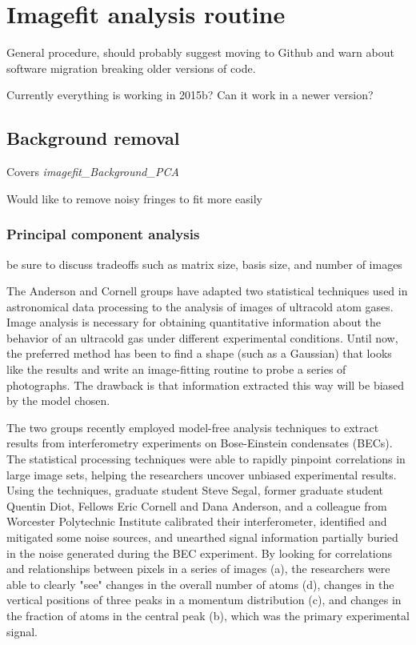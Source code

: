 \chapter{Imagefit analysis routine} \label{app:imagefitManual}
General procedure, should probably suggest moving to Github and warn about software migration breaking older versions of code.

Currently everything is working in 2015b? Can it work in a newer version?

\section{Background removal}

Covers \emph{imagefit\_Background\_PCA}

Would like to remove noisy fringes to fit more easily

\subsection{Principal component analysis}

be sure to discuss tradeoffs such as matrix size, basis size, and number of images

The Anderson and Cornell groups have adapted two statistical techniques used in astronomical data processing to the analysis of images of ultracold atom gases. Image analysis is necessary for obtaining quantitative information about the behavior of an ultracold gas under different experimental conditions. Until now, the preferred method has been to find a shape (such as a Gaussian) that looks like the results and write an image-fitting routine to probe a series of photographs. The drawback is that information extracted this way will be biased by the model chosen.

The two groups recently employed model-free analysis techniques to extract results from interferometry experiments on Bose-Einstein condensates (BECs). The statistical processing techniques were able to rapidly pinpoint correlations in large image sets, helping the researchers uncover unbiased experimental results. Using the techniques, graduate student Steve Segal, former graduate student Quentin Diot, Fellows Eric Cornell and Dana Anderson, and a colleague from Worcester Polytechnic Institute calibrated their interferometer, identified and mitigated some noise sources, and unearthed signal information partially buried in the noise generated during the BEC experiment. By looking for correlations and relationships between pixels in a series of images (a), the researchers were able to clearly "see" changes in the overall number of atoms (d), changes in the vertical positions of three peaks in a momentum distribution (c), and changes in the fraction of atoms in the central peak (b), which was the primary experimental signal.

